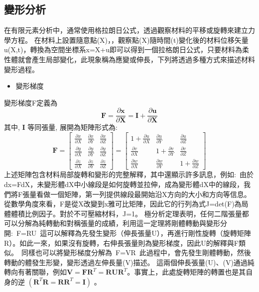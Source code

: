 \subsection{變形分析}

在有限元素分析中，通常使用格拉朗日公式，透過觀察材料的平移或旋轉來建立力學方程。
在材料上設置隨意點(X)，，觀察點(X)隨時間(t)變化後的材料位移矢量u(X,t)，轉換為空間坐標系x=X+u即可以得到一個拉格朗日公式，只要材料為柔性體就會產生局部變化，此現象稱為應變或伸長，下列將透過多種方式來描述材料變形過程。\

\begin{itemize}
\item 變形梯度
\end{itemize}

變形梯度F定義為
$$
\mathbf{F}=\frac{\partial \mathbf{x}}{\partial \mathbf{X}}=\mathbf{I}+\frac{\partial \mathbf{u}}{\partial \mathbf{X}}
$$
其中, $\mathbf{I}$ 等同張量, 展開為矩陣形式為:\
$$
\mathbf{F}=\left[\begin{array}{lll}
\frac{\partial x}{\partial X} & \frac{\partial x}{\partial Y} & \frac{\partial x}{\partial Z} \\
\frac{\partial y}{\partial X} & \frac{\partial y}{\partial Y} & \frac{\partial y}{\partial Z} \\
\frac{\partial z}{\partial X} & \frac{\partial z}{\partial Y} & \frac{\partial z}{\partial Z}
\end{array}\right]=\left[\begin{array}{ccc}
1+\frac{\partial u}{\partial X} & \frac{\partial u}{\partial Y} & \frac{\partial u}{\partial Z} \\
\frac{\partial v}{\partial X} & 1+\frac{\partial v}{\partial Y} & \frac{\partial v}{\partial Z} \\
\frac{\partial w}{\partial X} & \frac{\partial w}{\partial Y} & 1+\frac{\partial w}{\partial Z}
\end{array}\right]
$$
上述矩陣包含材料局部旋轉和變形的完整解釋，其中還顯示許多訊息，例如:\
由於dx=FdX，未變形體dX中小線段是如何旋轉並拉伸，成為變形體dX中的線段，我們將F張量看做一個矩陣，第一列提供線段最開始沿X方向的大小和方向等信息。從數學角度來看，F是從X改變到x雅可比矩陣，因此它的行列為式J=det(F)為局體體積比例因子。對於不可壓縮材料，J=1。
極分析定理表明，任何二階張量都可以分解為純轉動和對稱張量的成績，利用這一定理將剛體轉動與變形分開:\
F=RU\
這可以解釋為先發生變形（伸長張量U），再進行剛性旋轉（旋轉矩陣R）。如此一來，如果沒有旋轉，右伸長張量則為變形梯度，因此U的解釋與F類似。\
同樣也可以將變形梯度分解為\
F=VR\
此過程中，會先發生剛體轉動，然後轉動的體發生形變，變形透過左伸長量(V)描述。
這兩個伸長張量(U)、(V)通過純轉向有著關聯，例如$\mathbf{V}=\mathbf{F R}^T=\mathbf{R} \mathbf{U} \mathbf{R}^T$。事實上，此處旋轉矩陣的轉置也是其自身的逆 $\left(\mathbf{R}^T \mathbf{R}=\mathbf{R R}^T=\mathbf{I}\right)$ 。


